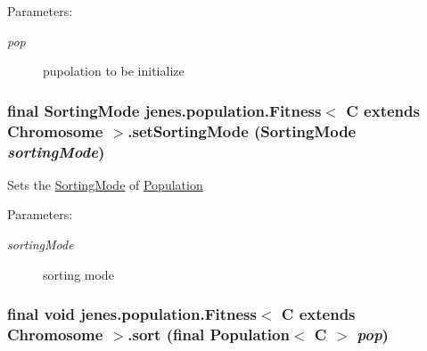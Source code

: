 \begin{Desc}
\item[Parameters:]
\begin{description}
\item[{\em pop}]pupolation to be initialize \end{description}
\end{Desc}
\hypertarget{classjenes_1_1population_1_1_fitness_3_01_c_01extends_01_chromosome_01_4_8741e8d5e0045bce51edbe0d58b32e0d}{
\subsubsection[setSortingMode]{\setlength{\rightskip}{0pt plus 5cm}final {\bf SortingMode} jenes.population.Fitness$<$ C extends Chromosome $>$.setSortingMode ({\bf SortingMode} {\em sortingMode})}}
\label{classjenes_1_1population_1_1_fitness_3_01_c_01extends_01_chromosome_01_4_8741e8d5e0045bce51edbe0d58b32e0d}


Sets the \hyperlink{}{SortingMode} of \hyperlink{}{Population} 

\begin{Desc}
\item[Parameters:]
\begin{description}
\item[{\em sortingMode}]sorting mode \end{description}
\end{Desc}
\hypertarget{classjenes_1_1population_1_1_fitness_3_01_c_01extends_01_chromosome_01_4_99d06b2b20048c7279139381247678c0}{
\subsubsection[sort]{\setlength{\rightskip}{0pt plus 5cm}final void jenes.population.Fitness$<$ C extends Chromosome $>$.sort (final Population$<$ C $>$ {\em pop})}}
\label{classjenes_1_1population_1_1_fitness_3_01_c_01extends_01_chromosome_01_4_99d06b2b20048c7279139381247678c0}


